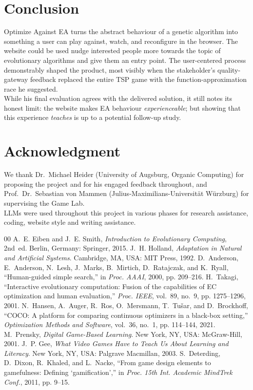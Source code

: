 \documentclass[conference]{IEEEtran}
\begin{document}
\section{Conclusion}
Optimize Against EA turns the abstract behaviour of a genetic algorithm into something a user can play against, watch, and reconfigure in the browser. 
The website could be used nudge interested people more towards the topic of evolutionary algorithms and give them an entry point. The user-centered process demonstrably shaped the product, most visibly when the stakeholder's quality-gateway feedback replaced the entire TSP game with the function-approximation race he suggested. \\
While his final evaluation agrees with the delivered solution, it still notes its honest limit: the website makes EA behaviour \emph{experienceable}; but showing that this experience \emph{teaches} is up to a potential follow-up study.

\section*{Acknowledgment}
We thank Dr.\ Michael Heider (University of Augsburg, Organic Computing) for proposing the project and for his engaged feedback throughout, and Prof.\ Dr.\ Sebastian von Mammen (Julius-Maximilians-Universit\"at W\"urzburg) for supervising the Game Lab.\\
LLMs were used throughout this project in various phases for research assistance, coding, website style and writing assistance.

\begin{thebibliography}{00}
 A.~E. Eiben and J.~E. Smith, \emph{Introduction to Evolutionary Computing}, 2nd~ed. Berlin, Germany: Springer, 2015.
 J.~H. Holland, \emph{Adaptation in Natural and Artificial Systems}. Cambridge, MA, USA: MIT Press, 1992.
 D.~Anderson, E.~Anderson, N.~Lesh, J.~Marks, B.~Mirtich, D.~Ratajczak, and K.~Ryall, ``Human-guided simple search,'' in \emph{Proc. AAAI}, 2000, pp. 209--216.
 H.~Takagi, ``Interactive evolutionary computation: Fusion of the capabilities of EC optimization and human evaluation,'' \emph{Proc. IEEE}, vol.~89, no.~9, pp. 1275--1296, 2001.
 N.~Hansen, A.~Auger, R.~Ros, O.~Mersmann, T.~Tu\v{s}ar, and D.~Brockhoff, ``COCO: A platform for comparing continuous optimizers in a black-box setting,'' \emph{Optimization Methods and Software}, vol.~36, no.~1, pp. 114--144, 2021.
 M.~Prensky, \emph{Digital Game-Based Learning}. New York, NY, USA: McGraw-Hill, 2001.
 J.~P. Gee, \emph{What Video Games Have to Teach Us About Learning and Literacy}. New York, NY, USA: Palgrave Macmillan, 2003.
 S.~Deterding, D.~Dixon, R.~Khaled, and L.~Nacke, ``From game design elements to gamefulness: Defining `gamification','' in \emph{Proc. 15th Int. Academic MindTrek Conf.}, 2011, pp. 9--15.
\end{thebibliography}
\end{document}
